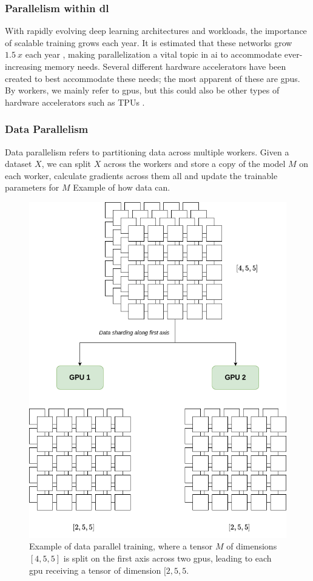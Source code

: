 \subsubsection{Parallelism within \acrlong{dl}}

With rapidly evolving deep learning architectures and workloads, the importance of scalable training grows each year. It is estimated that these networks grow $\qty{1.5}{x}$ each year \cite{9499913}, making parallelization a vital topic in \acrshort{ai} to accommodate ever-increasing memory needs. Several different hardware accelerators have been created to best accommodate these needs; the most apparent of these are \acrshort{gpu}s. By workers, we mainly refer to \acrshort{gpu}s, but this could also be other types of hardware accelerators such as TPUs \cite{jouppi2023tpu}.



\subsubsection{Data Parallelism}

Data parallelism refers to partitioning data across multiple workers. Given a dataset $X$, we can split $X$ across the workers and store a copy of the model $M$ on each worker, calculate gradients across them all and update the trainable parameters for $M$ Example of how data can. 

\begin{figure}[!h]
    \centering
    \includegraphics[width=0.7\linewidth]{figures/sharding.png}
    \caption{Example of data parallel training, where a tensor $M$ of dimensions $[4,5,5]$ is split on the first axis across two \acrshort{gpu}s, leading to each \acrshort{gpu} receiving a tensor of dimension $[2,5,5$.}
    \label{fig:dataparallel}
\end{figure}

